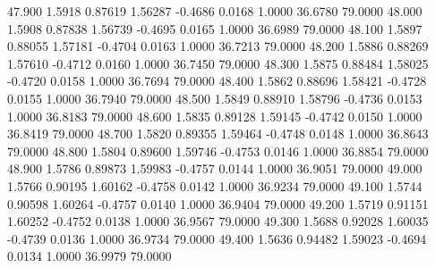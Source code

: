   47.900   1.5918   0.87619   1.56287  -0.4686   0.0168   1.0000  36.6780  79.0000
  48.000   1.5908   0.87838   1.56739  -0.4695   0.0165   1.0000  36.6989  79.0000
  48.100   1.5897   0.88055   1.57181  -0.4704   0.0163   1.0000  36.7213  79.0000
  48.200   1.5886   0.88269   1.57610  -0.4712   0.0160   1.0000  36.7450  79.0000
  48.300   1.5875   0.88484   1.58025  -0.4720   0.0158   1.0000  36.7694  79.0000
  48.400   1.5862   0.88696   1.58421  -0.4728   0.0155   1.0000  36.7940  79.0000
  48.500   1.5849   0.88910   1.58796  -0.4736   0.0153   1.0000  36.8183  79.0000
  48.600   1.5835   0.89128   1.59145  -0.4742   0.0150   1.0000  36.8419  79.0000
  48.700   1.5820   0.89355   1.59464  -0.4748   0.0148   1.0000  36.8643  79.0000
  48.800   1.5804   0.89600   1.59746  -0.4753   0.0146   1.0000  36.8854  79.0000
  48.900   1.5786   0.89873   1.59983  -0.4757   0.0144   1.0000  36.9051  79.0000
  49.000   1.5766   0.90195   1.60162  -0.4758   0.0142   1.0000  36.9234  79.0000
  49.100   1.5744   0.90598   1.60264  -0.4757   0.0140   1.0000  36.9404  79.0000
  49.200   1.5719   0.91151   1.60252  -0.4752   0.0138   1.0000  36.9567  79.0000
  49.300   1.5688   0.92028   1.60035  -0.4739   0.0136   1.0000  36.9734  79.0000
  49.400   1.5636   0.94482   1.59023  -0.4694   0.0134   1.0000  36.9979  79.0000

